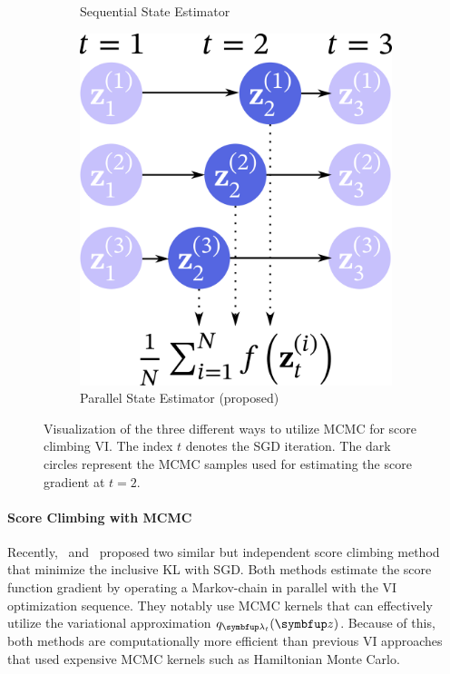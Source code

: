 \begin{figure}
\begin{subfigure}[b]{0.35\textwidth}
        \caption{Sequential State Estimator}\label{fig:seq}
    \end{subfigure}
    \begin{subfigure}[b]{0.3\textwidth}
        \centering
        \includegraphics[scale=0.25]{figures/diagram_3.png}
        \caption{Parallel State Estimator (proposed)}\label{fig:par}
    \end{subfigure}
    \caption{Visualization of the three different ways to utilize MCMC for score climbing VI.
      The index \(t\) denotes the SGD iteration.
      The dark circles represent the MCMC samples used for estimating the score gradient at \(t=2\).
    }\label{fig:overview}
  \vspace{-0.1in}
\end{figure}
%
\vspace{-0.05in}
\paragraph{Score Climbing with MCMC}
Recently,~\citet{NEURIPS2020_b2070693} and~\citet{pmlr-v124-ou20a} proposed two similar but independent score climbing method that minimize the inclusive KL with SGD.
Both methods estimate the score function gradient by operating a Markov-chain in parallel with the VI optimization sequence.
They notably use MCMC kernels that can effectively utilize the variational approximation \(q_{\vlambda_t}(\vz)\).
Because of this, both methods are computationally more efficient than previous VI approaches~\citep{pmlr-v97-ruiz19a, pmlr-v70-hoffman17a} that used expensive MCMC kernels such as Hamiltonian Monte Carlo.

